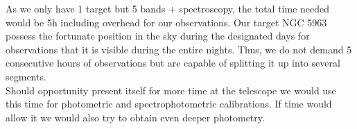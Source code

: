 \documentclass[11pt]{article}           %
\begin{document}
\begin{justificpage}[][]{}
{\noindent As we only have 1 target but 5 bands + spectroscopy, the total time needed would be 5h including overhead for our observations. Our target NGC 5963 possess the fortunate position in the sky during the designated days for observations that it is visible during the entire nights. Thus, we do not demand 5 consecutive hours of observations but are capable of splitting it up into several segments. \\

\noindent Should opportunity present itself for more time at the telescope we would use this time for photometric and spectrophotometric calibrations. If time would allow it we would also try to obtain even deeper photometry.}
\end{justificpage}
\end{document}
